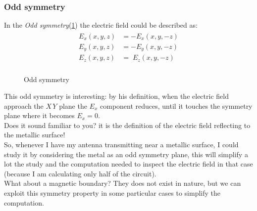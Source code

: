 \subsubsection*{Odd symmetry}
In the \emph{Odd symmetry}(\cref{fig:odd_simmetry}) the electric field could be described as:
\begin{align}
    \begin{split}
        E_x(x,y,z)&=-E_x(x,y,-z)\\[5pt]
        E_y(x,y,z)&=-E_y(x,y,-z)\\[5pt]
        E_z(x,y,z)&=\;E_z(x,y,-z)\\[5pt]
    \end{split}
\end{align}
\begin{figure}[H]
    \begin{center}
    \end{center}\caption{Odd symmetry}\label{fig:odd_simmetry} 
\end{figure}
This odd symmetry is interesting: by his definition, when the electric field approach the $X\,Y$ plane the $E_x$ component reduces, until it touches the symmetry plane where it becomes $E_x=0$.\\
Does it sound familiar to you? it is the definition of the electric field reflecting to the metallic surface!\\
So, whenever I have my antenna transmitting near a metallic surface, I could study it by considering the metal as an odd symmetry plane, this will simplify a lot the study and the computation needed to inspect the electric field in that case (because I am calculating only half of the circuit).\\
What about a magnetic boundary? They does not exist in nature, but we can exploit this symmetry property in some particular cases to simplify the computation.
